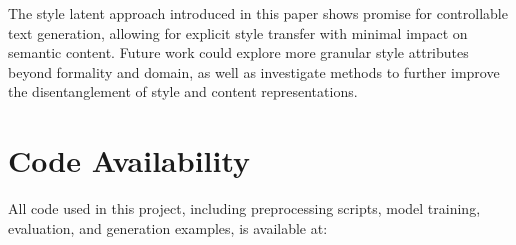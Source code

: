 \documentclass[twocolumn]{article}
\begin{document}
The style latent approach introduced in this paper shows promise for controllable text generation, allowing for explicit style transfer with minimal impact on semantic content. Future work could explore more granular style attributes beyond formality and domain, as well as investigate methods to further improve the disentanglement of style and content representations.

\section{Code Availability}

All code used in this project, including preprocessing scripts, model training, evaluation, and generation examples, is available at:

\href{https://github.com/j6k4m8/llm_style}{\texttt{}}



\small

\end{document}
